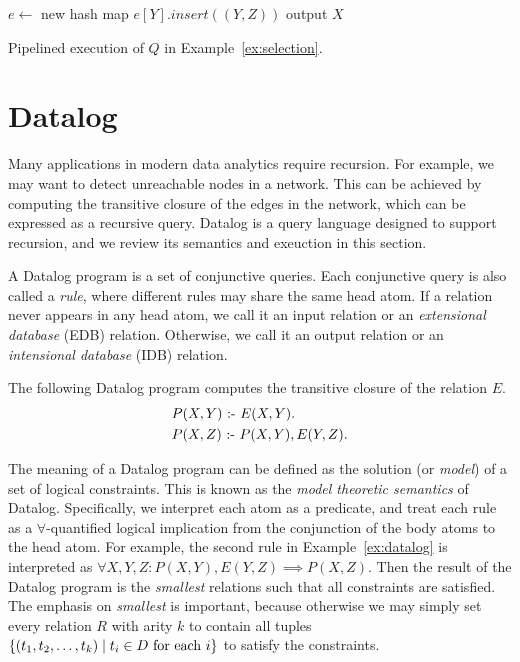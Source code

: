 \begin{algorithm}
$e \gets $ new hash map \;
{
    $e[Y].insert((Y, Z))$\;
}
{
    {
        {
            output $X$\;
        }
    }
}
\caption{Pipelined execution of $Q$ in Example~\ref{ex:selection}.}
\label{algo:pipeline} 
\end{algorithm}

\section{Datalog}
\label{sec:datalog}

Many applications in modern data analytics require recursion.
For example, we may want to detect unreachable nodes in a network.
This can be achieved by computing the transitive closure 
 of the edges in the network,
 which can be expressed as a recursive query.
Datalog is a query language designed to support recursion, 
 and we review its semantics and exeuction in this section.

A Datalog program is a set of conjunctive queries.
Each conjunctive query is also called a {\em rule}, 
 where different rules may share the same head atom. 
If a relation never appears in any head atom,
 we call it an input relation or an {\em extensional database} (EDB) relation.
Otherwise, we call it an output relation or an {\em intensional database} (IDB) relation.

\begin{ex}
\label{ex:datalog}
The following Datalog program computes the transitive closure of the relation $E$. 
\begin{align*}
  &P(X, Y) \text{ :- } E(X, Y).\\
  &P(X, Z) \text{ :- } P(X, Y), E(Y, Z).
\end{align*}
\end{ex}

The meaning of a Datalog program can be defined as the solution (or {\em model}) of 
 a set of logical constraints.
This is known as the {\em model theoretic semantics} of Datalog.
Specifically, we interpret each atom as a predicate,
 and treat each rule as a $\forall$-quantified logical implication
 from the conjunction of the body atoms to the head atom.
For example, the second rule in Example~\ref{ex:datalog} 
 is interpreted as $\forall X, Y, Z : P(X, Y), E(Y, Z) \implies P(X, Z)$.
Then the result of the Datalog program is the {\em smallest} relations 
 such that all constraints are satisfied.
The emphasis on {\em smallest} is important, 
 because otherwise we may simply set every relation $R$ with arity $k$ 
 to contain all tuples $\{{(t_1, t_2, \ldots, t_k)}\mid{t_i \in D \text{ for each } i}\}$
 to satisfy the constraints.

